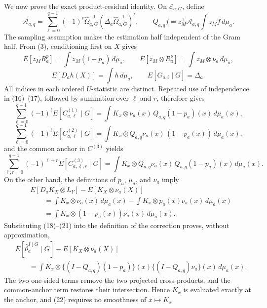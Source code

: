 We now prove the exact product-residual identity.  On \(\mathcal E_{a,G}\), define
\[
 \mathcal A_{a,q}
 =\sum_{\ell=0}^{q-1}(-1)^\ell
 \widehat\Omega_{a,G}^{-1}
 (\Delta_a\widehat\Omega_{a,G}^{-1})^\ell,
 \qquad
 Q_{a,q}f
 =z_M^\top\mathcal A_{a,q}\int z_Mf\,d\mu_a.
 \tag{15}
\]
The sampling assumption makes the estimation half independent of the Gram half.  From (3), conditioning first on \(X\) gives
\[
 E[z_MR_a^p]
 =\int z_M(1-p_a)\,d\mu_a,
 \qquad
 E[z_M\otimes R_a^\nu]
 =\int z_M\otimes\nu_a\,d\mu_a,
 \tag{16}
\]
\[
 E[D_ah(X)]=\int h\,d\mu_a,
 \qquad
 E[G_{a,i}\mid G]=\Delta_a.
 \tag{17}
\]
All indices in each ordered \(U\)-statistic are distinct.  Repeated use of independence in (16)--(17), followed by summation over \(\ell\) and \(r\), therefore gives
\[
 \sum_{\ell=0}^{q-1}(-1)^\ell
 E[C^{(1)}_{a,\ell}\mid G]
 =\int K_x\otimes\nu_a(x)\,
        Q_{a,q}(1-p_a)(x)\,d\mu_a(x),
 \tag{18}
\]
\[
 \sum_{\ell=0}^{q-1}(-1)^\ell
 E[C^{(2)}_{a,\ell}\mid G]
 =\int K_x\otimes Q_{a,q}\nu_a(x)\,
        (1-p_a(x))\,d\mu_a(x),
 \tag{19}
\]
and the common anchor in \(C^{(3)}\) yields
\[
 \sum_{\ell,r=0}^{q-1}(-1)^{\ell+r}
 E[C^{(3)}_{a,\ell,r}\mid G]
 =\int K_x\otimes Q_{a,q}\nu_a(x)\,
        Q_{a,q}(1-p_a)(x)\,d\mu_a(x).
 \tag{20}
\]
On the other hand, the definitions of \(p_a\), \(\mu_a\), and \(\nu_a\) imply
\[
 \begin{aligned}
 &E[D_aK_X\otimes L_Y]
   -E[K_X\otimes\nu_a(X)]\\
 &\qquad
 =\int K_x\otimes\nu_a(x)\,d\mu_a(x)
  -\int K_x\otimes p_a(x)\nu_a(x)\,d\mu_a(x)\\
 &\qquad
 =\int K_x\otimes(1-p_a(x))\nu_a(x)\,d\mu_a(x).
 \end{aligned}
 \tag{21}
\]
Substituting (18)--(21) into the definition of the correction proves, without approximation,
\[
 \begin{aligned}
 &E[\widehat\theta_a^{I\mid G}\mid G]
   -E[K_X\otimes\nu_a(X)]\\
 &\qquad
 =\int K_x\otimes
   \{(I-Q_{a,q})(1-p_a)\}(x)
   \{(I-Q_{a,q})\nu_a\}(x)\,d\mu_a(x).
 \end{aligned}
 \tag{22}
\]
The two one-sided terms remove the two projected cross-products, and the common-anchor term restores their intersection.  Hence \(K_x\) is evaluated exactly at the anchor, and (22) requires no smoothness of \(x\mapsto K_x\).

